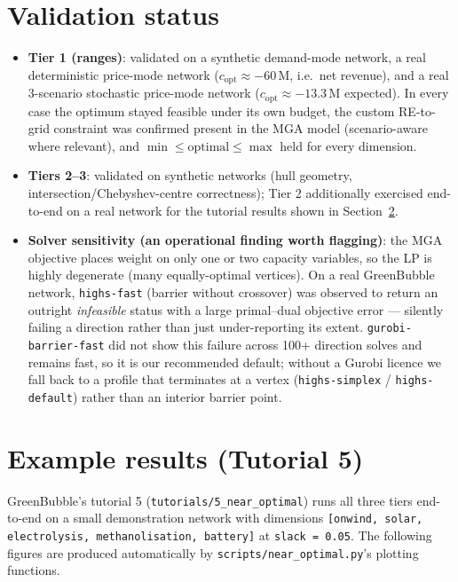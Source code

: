 \documentclass[11pt]{article}
\begin{document}
\section{Validation status}
\begin{itemize}[leftmargin=1.4em]
  \item \textbf{Tier 1 (ranges)}: validated on a synthetic demand-mode
    network, a real deterministic price-mode network
    ($c_{\mathrm{opt}} \approx -60\,\text{M}$, i.e.\ net revenue), and a
    real 3-scenario stochastic price-mode network
    ($c_{\mathrm{opt}} \approx -13.3\,\text{M}$ expected). In every case the
    optimum stayed feasible under its own budget, the custom
    RE-to-grid constraint was confirmed present in the MGA model
    (scenario-aware where relevant), and $\min \le \text{optimal} \le
    \max$ held for every dimension.
  \item \textbf{Tiers 2--3}: validated on synthetic networks (hull geometry,
    intersection/Chebyshev-centre correctness); Tier 2 additionally
    exercised end-to-end on a real network for the tutorial results shown
    in Section~\ref{sec:results}.
  \item \textbf{Solver sensitivity (an operational finding worth
    flagging)}: the MGA objective places weight on only one or two capacity
    variables, so the LP is highly degenerate (many equally-optimal
    vertices). On a real GreenBubble network,
    \texttt{highs-fast} (barrier without crossover) was observed to return
    an outright \emph{infeasible} status with a large primal--dual
    objective error --- silently failing a direction rather than just
    under-reporting its extent. \texttt{gurobi-barrier-fast} did not show
    this failure across 100+ direction solves and remains fast, so it is
    our recommended default; without a Gurobi licence we fall back to a
    profile that terminates at a vertex (\texttt{highs-simplex} /
    \texttt{highs-default}) rather than an interior barrier point.
\end{itemize}

\section{Example results (Tutorial 5)}
\label{sec:results}
GreenBubble's tutorial 5 (\texttt{tutorials/5\_near\_optimal}) runs all
three tiers end-to-end on a small demonstration network with dimensions
\texttt{[onwind, solar, electrolysis, methanolisation, battery]} at
\texttt{slack = 0.05}. The following figures are produced automatically by
\texttt{scripts/near\_optimal.py}'s plotting functions.
\end{document}
